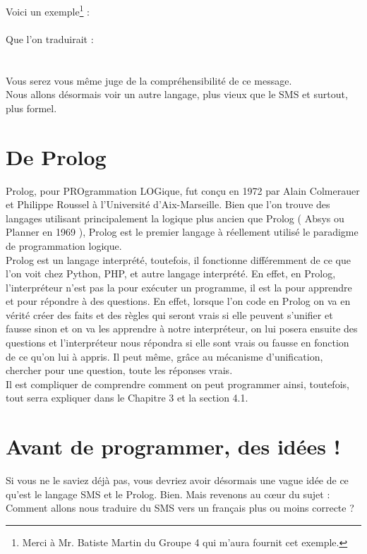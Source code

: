 \documentclass[11pt]{report}
\begin{document}
	Voici un exemple\footnote{Merci à Mr. Batiste Martin du Groupe 4 qui m'aura fournit cet exemple.} : \\
	\\
	Que l'on traduirait :\\
	\\\\
	Vous serez vous même juge de la compréhensibilité de ce message.\\
	Nous allons désormais voir un autre langage, plus vieux que le SMS et surtout, plus formel.
	
	\section{De Prolog}
	Prolog, pour PROgrammation LOGique, fut conçu en 1972 par Alain Colmerauer et Philippe Roussel à l'Université d'Aix-Marseille. Bien que l'on trouve des langages utilisant principalement la logique plus ancien que Prolog ( Absys ou Planner en 1969 ), Prolog est le premier langage à réellement utilisé le paradigme de programmation logique.\\
	Prolog est un langage interprété, toutefois, il fonctionne différemment de ce que l'on voit chez Python, PHP, et autre langage interprété. En effet, en Prolog, l'interpréteur n'est pas la pour exécuter un programme, il est la pour apprendre et pour répondre à des questions. En effet, lorsque l'on code en Prolog on va en vérité créer des faits et des règles qui seront vrais si elle peuvent s'unifier et fausse sinon et on va les apprendre à notre interpréteur, on lui posera ensuite des questions et l'interpréteur nous répondra si elle sont vrais ou fausse en fonction de ce qu'on lui à appris. Il peut même, grâce au mécanisme d'unification, chercher pour une question, toute les réponses vrais.\\
	Il est compliquer de comprendre comment on peut programmer ainsi, toutefois, tout serra expliquer dans le Chapitre 3 et la section 4.1.
	
	\section{Avant de programmer, des idées !}
	Si vous ne le saviez déjà pas, vous devriez avoir désormais une vague idée de ce qu'est le langage SMS et le Prolog. Bien. Mais revenons au cœur du sujet : Comment allons nous traduire du SMS vers un français plus ou moins correcte ?
\end{document}
